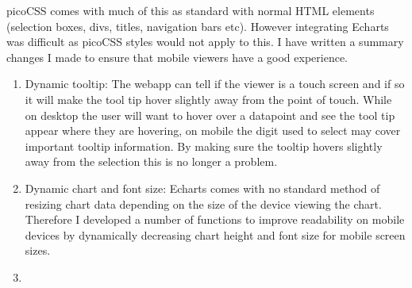picoCSS comes with much of this as standard with normal HTML elements (selection
boxes, divs, titles, navigation bars etc). However integrating Echarts was
difficult as picoCSS styles would not apply to this. I have written a summary
changes I made to ensure that mobile viewers have a good experience.

\begin{enumerate}
    \item Dynamic tooltip: The webapp can tell if the viewer is a touch screen
          and if so it will make the tool tip hover slightly away from the point
          of touch. While on desktop the user will want to hover over a
          datapoint and see the tool tip appear where they are hovering, on
          mobile the digit used to select may cover important tooltip
          information. By making sure the tooltip hovers slightly away from the
          selection this is no longer a problem.
    \item Dynamic chart and font size: Echarts comes with no standard method of
          resizing chart data depending on the size of the device viewing the
          chart. Therefore I developed a number of functions to improve
          readability on mobile devices by dynamically decreasing chart height
          and font size for mobile screen sizes.
    \item
\end{enumerate}



